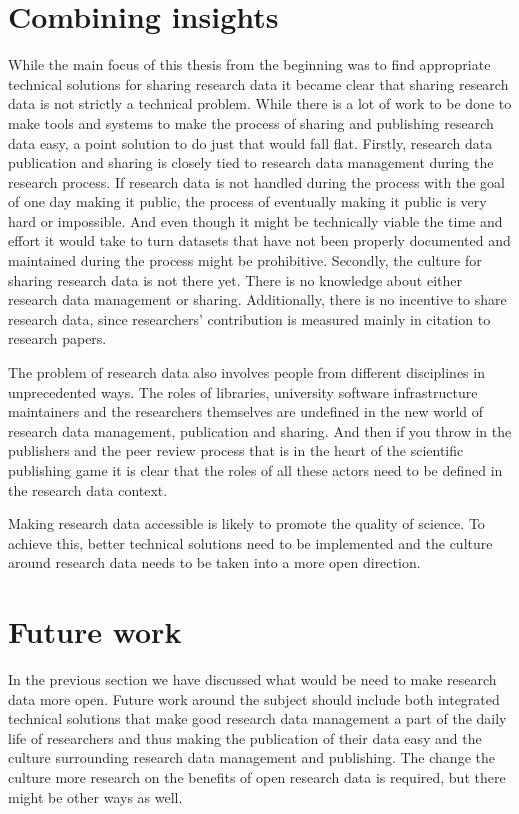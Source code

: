 \section{Combining insights}

While the main focus of this thesis from the beginning was to find
appropriate technical solutions for sharing research data it became clear
that sharing research data is not strictly a technical problem. While there is
a lot of work to be done to make tools and systems to make the process of
sharing and publishing research data easy, a point solution to do just that
would fall flat. Firstly, research data publication and sharing is closely
tied to research data management during the research process. If research data
is not handled during the process with the goal of one day making it public,
the process of eventually making it public is very hard or impossible. And even
though it might be technically viable the time and effort it would take to
turn datasets that have not been properly documented and maintained during the
process might be prohibitive. Secondly, the culture for sharing research data
is not there yet. There is no knowledge about either research data management
or sharing. Additionally, there is no incentive to share research data, since
researchers' contribution is measured mainly in citation to research papers.

The problem of research data also involves people from different disciplines
in unprecedented ways. The roles of libraries, university software
infrastructure maintainers and the researchers themselves are undefined in
the new world of research data management, publication and sharing. And then
if you throw in the publishers and the peer review process that is in the
heart of the scientific publishing game it is clear that the roles of all
these actors need to be defined in the research data context.

Making research data accessible is likely to promote the quality of science.
To achieve this, better technical solutions need to be implemented and the
culture around research data needs to be taken into a more open direction.

\section{Future work}

In the previous section we have discussed what would be need to make research data
more open. Future work around the subject should include both integrated
technical solutions that make good research data management a part of the
daily life of researchers and thus making the publication of their data easy
and the culture surrounding research data management and publishing.
The change the culture more research on the benefits of open research data
is required, but there might be other ways as well.

